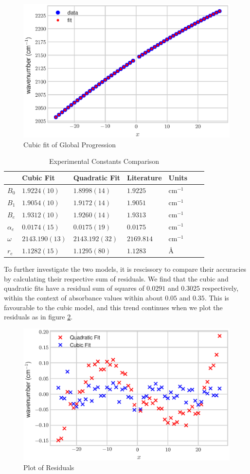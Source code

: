 \documentclass[aps,prl,reprint,10pt,amsmath,amssymb,superscriptaddress,a4paper]{revtex4-2}
\begin{document}
\begin{figure}[H]
\includegraphics[width = 8 cm]{CubeFit.eps}
\caption{Cubic fit of Global Progression}
\label{fig:Cubic}
\end{figure}

\begin{table}[h]
\begin{tabular}{@{}lllllll@{}}
\toprule
                         & Cubic Fit    		& Quadratic Fit 		& Literature	&Units		& \\ \midrule
$B_0$          	& $1.9224(10)$       	& $1.8998(14)$         &$1.9225$ 	&cm$^{-1}$	& \\ 
$B_1$   		& $1.9054 (10)$      	& $1.9172(14)$         &$1.9051$	&cm$^{-1}$	& \\ 
$B_e$    		& $1.9312(10)$       	& $1.9260(14)$         &$1.9313$ 	&cm$^{-1}$	& \\
$\alpha_e$    	& $0.0174(15)$       	& $0.0175(19)$         &$0.0175$ 	&cm$^{-1}$	& \\ 
$\omega$ 	& $2143.190(13)$  	& $2143.192(32)$ 	&$2169.814$ 	&cm$^{-1}$	& \\ 
$r_e$   		& $1.1282(15)$       	& $1.1295(80)$         &$1.1283$	&\AA			& \\ \bottomrule
\end{tabular}
\caption{Experimental Constants Comparison \cite{NIST}\cite{MolSpectra}\cite{Education}}
\label{tab:results}
\end{table}

\pagebreak

To further investigate the two models, it is rescissory to compare their accuracies by calculating their respective sum of residuals. We find that the cubic and quadratic fits have a residual sum of squares of $0.0291$ and $0.3025$ respectively, within the context of absorbance values within about $0.05$ and $0.35$. This is favourable to the cubic model, and this trend continues when we plot the residuals as in figure \ref{fig:Residuals}.

\begin{figure}[h]
\includegraphics[width = 8 cm]{Residuals.eps}
\caption{Plot of Residuals}
\label{fig:Residuals}
\end{figure}
\end{document}
